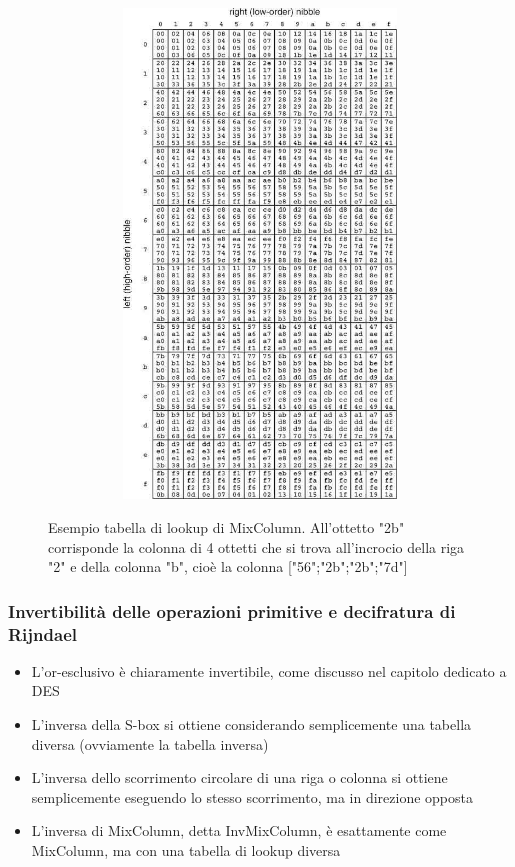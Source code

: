 \begin{figure}[htbp]
	\centering%
	\subfigure%
	{\includegraphics[height=13cm, width=13cm, keepaspectratio]{Immagini/chiave_segreta/rijndael_mixcol_lookup.png}}
	\caption{Esempio tabella di lookup di MixColumn. All'ottetto "2b" corrisponde la colonna di 4 ottetti che si trova all’incrocio della riga "2" e della colonna "b", cioè la colonna ["56";"2b";"2b";"7d"] \label{fig:Rij_mixcol_lookup}} 	
\end{figure}

\subsubsection{Invertibilità delle operazioni primitive e decifratura di Rijndael}
\begin{itemize}
  \item L'or-esclusivo è chiaramente invertibile, come discusso nel capitolo dedicato a DES
  \item L'inversa della S-box si ottiene considerando semplicemente una tabella diversa (ovviamente la tabella inversa)
  \item L'inversa dello scorrimento circolare di una riga o colonna si ottiene semplicemente eseguendo lo stesso scorrimento, ma in direzione opposta
  \item L'inversa di MixColumn, detta InvMixColumn, è esattamente come MixColumn, ma con una tabella di lookup diversa
\end{itemize}

